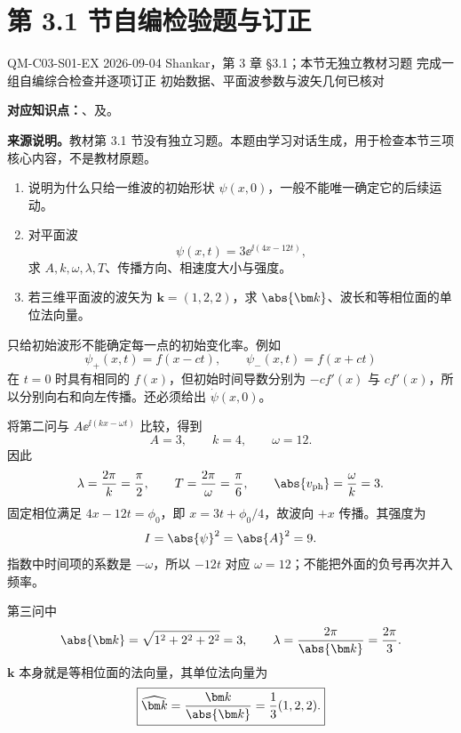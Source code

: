 
\section{第 3.1 节自编检验题与订正}
\label{exercise-set:QM-C03-S01}

\exercisemeta
  {QM-C03-S01-EX}
  {2026-09-04}
  {Shankar，第 3 章 \S 3.1；本节无独立教材习题}
  {完成一组自编综合检查并逐项订正}
  {初始数据、平面波参数与波矢几何已核对}


\textbf{对应知识点：}、及。

\textbf{来源说明。}教材第 3.1 节没有独立习题。本题由学习对话生成，用于检查本节三项核心内容，不是教材原题。

\begin{enumerate}[leftmargin=*]
  \item 说明为什么只给一维波的初始形状 $\psi(x,0)$，一般不能唯一确定它的后续运动。
  \item 对平面波
  \[
    \psi(x,t)=3\ee^{\ii(4x-12t)},
  \]
  求 $A,k,\omega,\lambda,T$、传播方向、相速度大小与强度。
  \item 若三维平面波的波矢为 $\bm k=(1,2,2)$，求 $\abs{\bm k}$、波长和等相位面的单位法向量。
\end{enumerate}

\begin{checkedsolution}
只给初始波形不能确定每一点的初始变化率。例如
\[
  \psi_+(x,t)=f(x-ct),
  \qquad
  \psi_-(x,t)=f(x+ct)
\]
在 $t=0$ 时具有相同的 $f(x)$，但初始时间导数分别为 $-cf'(x)$ 与 $cf'(x)$，所以分别向右和向左传播。还必须给出 $\dot\psi(x,0)$。

将第二问与 $A\ee^{\ii(kx-\omega t)}$ 比较，得到
\[
  A=3,
  \qquad
  k=4,
  \qquad
  \omega=12.
\]
因此
\begin{equation}
  \lambda=\frac{2\pi}{k}=\frac{\pi}{2},
  \qquad
  T=\frac{2\pi}{\omega}=\frac{\pi}{6},
  \qquad
  \abs{v_{\mathrm{ph}}}=\frac{\omega}{k}=3.
  \label{eq:QM-C03-S01-E01-plane-wave-results}
\end{equation}
固定相位满足 $4x-12t=\phi_0$，即 $x=3t+\phi_0/4$，故波向 $+x$ 传播。其强度为
\[
  I=\abs{\psi}^2=\abs{A}^2=9.
\]
指数中时间项的系数是 $-\omega$，所以 $-12t$ 对应 $\omega=12$；不能把外面的负号再次并入频率。

第三问中
\[
  \abs{\bm k}=\sqrt{1^2+2^2+2^2}=3,
  \qquad
  \lambda=\frac{2\pi}{\abs{\bm k}}=\frac{2\pi}{3}.
\]
$\bm k$ 本身就是等相位面的法向量，其单位法向量为
\begin{equation}
  \boxed{
  \widehat{\bm k}
  =\frac{\bm k}{\abs{\bm k}}
  =\frac13(1,2,2).}
  \label{eq:QM-C03-S01-E01-unit-normal}
\end{equation}
\end{checkedsolution}

